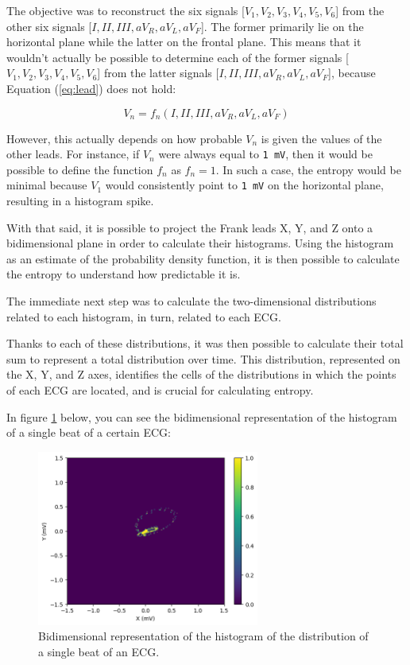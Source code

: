 \documentclass[12pt,english]{report}
\begin{document}
The objective was to reconstruct the six signals [$ V_{1}, V_{2}, V_{3}, V_{4}, V_{5}, V_{6} $] from the other six signals [$ I, II, III, aV_{R}, aV_{L}, aV_{F} $]. The former primarily lie on the horizontal plane while the latter on the frontal plane. This means that it wouldn't actually be possible to determine each of the former signals [$ V_{1}, V_{2}, V_{3}, V_{4}, V_{5}, V_{6} $] from the latter signals [$ I, II, III, aV_{R}, aV_{L}, aV_{F} $], because Equation (\ref{eq:lead}) does not hold:

\begin{equation}
    V_{n} = f_{n}(I, II, III, aV_{R}, aV_{L}, aV_{F})
    \label{eq:lead}
\end{equation}

However, this actually depends on how probable $ V_{n} $ is given the values of the other leads. For instance, if $ V_{n} $ were always equal to \texttt{1 mV}, then it would be possible to define the function $ f_{n} $ as $ f_{n} = 1 $. In such a case, the entropy would be minimal because $ V_{1} $ would consistently point to \texttt{1 mV} on the horizontal plane, resulting in a histogram spike.

With that said, it is possible to project the Frank leads X, Y, and Z onto a bidimensional plane in order to calculate their histograms. Using the histogram as an estimate of the probability density function, it is then possible to calculate the entropy to understand how predictable it is.

The immediate next step was to calculate the two-dimensional distributions related to each histogram, in turn, related to each ECG.

Thanks to each of these distributions, it was then possible to calculate their total sum to represent a total distribution over time. This distribution, represented on the X, Y, and Z axes, identifies the cells of the distributions in which the points of each ECG are located, and is crucial for calculating entropy.

In figure \ref{fig:histogram_single_beat} below, you can see the bidimensional representation of the histogram of a single beat of a certain ECG:

\begin{figure}[H]
    \centering
    \includegraphics[width=0.65\textwidth]{images/histogram_single_beat.png}
    \captionsetup{justification=centering}
    \caption{Bidimensional representation of the histogram of the distribution of a single beat of an ECG.}
    \label{fig:histogram_single_beat}
\end{figure}
\end{document}
